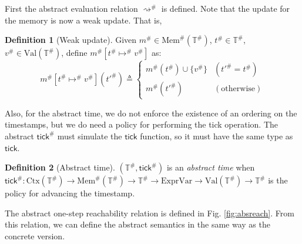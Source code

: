 \documentclass[acmsmall,review]{acmart}\settopmatter{printfolios=true,printccs=false,printacmref=false}
\theoremstyle{definition}
\newtheorem{definition}{Definition}[section]
\newcommand*{\A}[1]{{#1}^{\#}}
\newcommand*{\ExprVar}{\text{ExprVar}}
\newcommand*{\Time}{\mathbb{T}}
\newcommand*{\ATime}{\A{\Time}}
\newcommand*{\Ctx}[1]{\text{Ctx}({#1})}
\newcommand*{\Value}[1]{\text{Val}({#1})}
\newcommand*{\mem}{m}
\newcommand*{\AMem}[1]{\A{\text{Mem}}({#1})}
\newcommand*{\tick}{\mathsf{tick}}
\begin{document}
First the abstract evaluation relation $\A{\rightsquigarrow}$ is defined.
Note that the update for the memory is now a weak update. That is,
\begin{definition}[Weak update]
  Given $\A{\mem}\in\AMem{\ATime}$, $\A{t}\in\ATime$, $\A{v}\in\Value{\ATime}$, define $\A{\mem}[\A{t}\A{\mapsto}\A{v}]$ as:
  \[
    \A{\mem}[\A{t}\A{\mapsto}\A{v}](\A{t'})\triangleq
    \begin{cases}
      \A{\mem}(\A{t})\cup\{\A{v}\} & (\A{t'}=\A{t})     \\
      \A{\mem}(\A{t'})             & (\text{otherwise})
    \end{cases}
  \]
\end{definition}

Also, for the abstract time, we do not enforce the existence of an ordering on the timestamps, but we do need a policy for performing the tick operation.
The abstract $\A\tick$ must simulate the $\tick$ function, so it must have the same type as $\tick$.
\begin{definition}[Abstract time]
  $(\ATime,\A{\tick})$ is an \emph{abstract time} when $\A{\tick}:\Ctx{\ATime}\rightarrow\AMem{\ATime}\rightarrow\ATime\rightarrow\ExprVar\rightarrow\Value{\ATime}\rightarrow\ATime$ is the policy for advancing the timestamp.
\end{definition}

The abstract one-step reachability relation is defined in Fig. \ref{fig:absreach}.
From this relation, we can define the abstract semantics in the same way as the concrete version.
\end{document}
